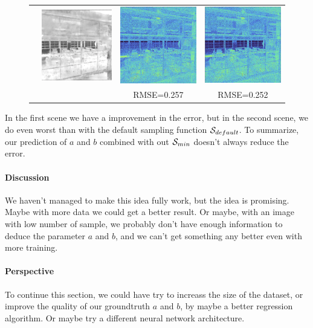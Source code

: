 \documentclass{classeENS}
\begin{document}
\begin{figure}[H]
\begin{tabular}{|c|c|c|c|}
        & \includegraphics[width=35mm]{image/without/ppsm.png}
        & \includegraphics[width=35mm]{image/without/ppp.png}
        & \includegraphics[width=35mm]{image/without/pp_norm.png} \\
         &  & RMSE=0.257 & RMSE=0.252 \\
        \hline
    \end{tabular}
\end{figure}
In the first scene we have a improvement in the error, but in the second scene, we do 
even worst than with the default sampling function $\mathcal S_{default}$. To summarize, our
prediction of $a$ and $b$ combined with out $\mathcal S_{min}$ doesn't always reduce 
the error.

\paragraph*{Discussion} We haven't managed to make this idea fully work, 
 but the idea is promising. Maybe with more data we could get a better result. 
 Or maybe, with an image with low number of sample, we probably don't have 
 enough information to deduce the parameter $a$ and $b$, and we can't get 
 something any better even with more training. 

\paragraph*{Perspective} To continue this section, we could have try to increass
the size of the dataset, or improve the quality of our groundtruth $a$ and $b$, by maybe 
a better regression algorithm. Or maybe try a different neural network architecture.
\end{document}
